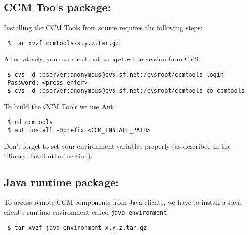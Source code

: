 \subsection{CCM Tools package:}
Installing the CCM Tools from source requires the following steps:

\begin{small}
\begin{verbatim} 
 $ tar xvzf ccmtools-x.y.z.tar.gz
\end{verbatim}
\end{small}

\noindent
Alternatively, you can check out an up-to-date version from CVS:
\begin{small}
\begin{verbatim}
 $ cvs -d :pserver:anonymous@cvs.sf.net:/cvsroot/ccmtools login
 Password: <press enter>
 $ cvs -d :pserver:anonymous@cvs.sf.net:/cvsroot/ccmtools co ccmtools
\end{verbatim}
\end{small}

\noindent
To build the CCM Tools we use Ant: 
\begin{small}
\begin{verbatim}
 $ cd ccmtools
 $ ant install -Dprefix=<CCM_INSTALL_PATH>
\end{verbatim}
\end{small}

\noindent
Don't forget to set your environment variables properly
(as described in the 'Binary distribution' section). 


\subsection{Java runtime package:}
To access remote CCM components from Java clients, we have to install
a Java client's runtime environment called {\tt java-environment}:

\begin{small}
\begin{verbatim}
 $ tar xvzf java-environment-x.y.z.tar.gz
\end{verbatim}
\end{small}

